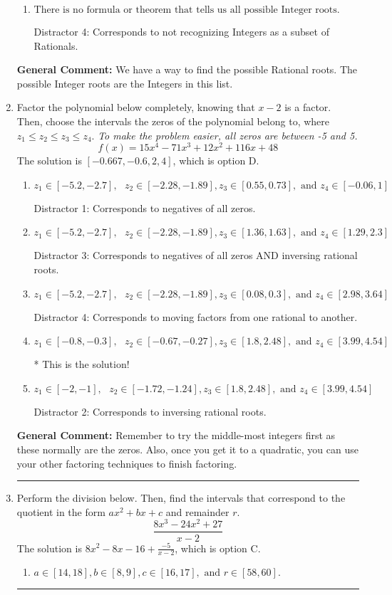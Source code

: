 \documentclass{extbook}[14pt]
\newcommand{\litem}[1]{\item #1

\rule{\textwidth}{0.4pt}}
\begin{document}
\begin{enumerate}
{\begin{enumerate}[label=\Alph*.]
 Distractor 3: Corresponds to the plus or minus of the inverse quotient (an/a0) of the factors. 
\item \( \text{There is no formula or theorem that tells us all possible Integer roots.} \)

 Distractor 4: Corresponds to not recognizing Integers as a subset of Rationals.
\end{enumerate}

\textbf{General Comment:} We have a way to find the possible Rational roots. The possible Integer roots are the Integers in this list.
}
\litem{
Factor the polynomial below completely, knowing that $x -2$ is a factor. Then, choose the intervals the zeros of the polynomial belong to, where $z_1 \leq z_2 \leq z_3 \leq z_4$. \textit{To make the problem easier, all zeros are between -5 and 5.}
\[ f(x) = 15x^{4} -71 x^{3} +12 x^{2} +116 x + 48 \]The solution is \( [-0.667, -0.6, 2, 4] \), which is option D.\begin{enumerate}[label=\Alph*.]
\item \( z_1 \in [-5.2, -2.7], \text{   }  z_2 \in [-2.28, -1.89], z_3 \in [0.55, 0.73], \text{   and   } z_4 \in [-0.06, 1] \)

 Distractor 1: Corresponds to negatives of all zeros.
\item \( z_1 \in [-5.2, -2.7], \text{   }  z_2 \in [-2.28, -1.89], z_3 \in [1.36, 1.63], \text{   and   } z_4 \in [1.29, 2.3] \)

 Distractor 3: Corresponds to negatives of all zeros AND inversing rational roots.
\item \( z_1 \in [-5.2, -2.7], \text{   }  z_2 \in [-2.28, -1.89], z_3 \in [0.08, 0.3], \text{   and   } z_4 \in [2.98, 3.64] \)

 Distractor 4: Corresponds to moving factors from one rational to another.
\item \( z_1 \in [-0.8, -0.3], \text{   }  z_2 \in [-0.67, -0.27], z_3 \in [1.8, 2.48], \text{   and   } z_4 \in [3.99, 4.54] \)

* This is the solution!
\item \( z_1 \in [-2, -1], \text{   }  z_2 \in [-1.72, -1.24], z_3 \in [1.8, 2.48], \text{   and   } z_4 \in [3.99, 4.54] \)

 Distractor 2: Corresponds to inversing rational roots.
\end{enumerate}

\textbf{General Comment:} Remember to try the middle-most integers first as these normally are the zeros. Also, once you get it to a quadratic, you can use your other factoring techniques to finish factoring.
}
\litem{
Perform the division below. Then, find the intervals that correspond to the quotient in the form $ax^2+bx+c$ and remainder $r$.
\[ \frac{8x^{3} -24 x^{2} + 27}{x -2} \]The solution is \( 8x^{2} -8 x -16 + \frac{-5}{x -2} \), which is option C.\begin{enumerate}[label=\Alph*.]
\item \( a \in [14, 18], b \in [8, 9], c \in [16, 17], \text{ and } r \in [58, 60]. \)


\end{enumerate}}
\end{enumerate}
\end{document}
